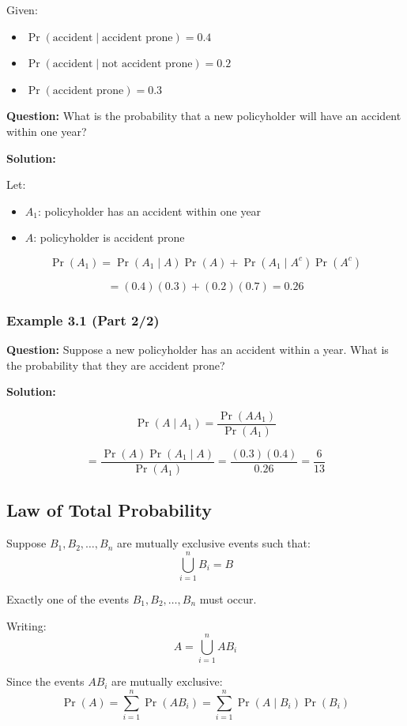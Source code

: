\documentclass[11pt]{article}
\begin{document}
Given:
\begin{itemize}[leftmargin=1.5em]
    \item $\Pr(\text{accident} \mid \text{accident prone}) = 0.4$
    \item $\Pr(\text{accident} \mid \text{not accident prone}) = 0.2$
    \item $\Pr(\text{accident prone}) = 0.3$
\end{itemize}

\textbf{Question:}  
What is the probability that a new policyholder will have an accident within one year?

\textbf{Solution:}

Let:
\begin{itemize}[leftmargin=1.5em]
    \item $A_1$: policyholder has an accident within one year
    \item $A$: policyholder is accident prone
\end{itemize}

\[
\Pr(A_1) = \Pr(A_1 \mid A)\Pr(A) + \Pr(A_1 \mid A^c)\Pr(A^c)
\]

\[
= (0.4)(0.3) + (0.2)(0.7) = 0.26
\]

\subsubsection*{Example 3.1 (Part 2/2)}

\textbf{Question:}  
Suppose a new policyholder has an accident within a year. What is the probability that they are accident prone?

\textbf{Solution:}

\[
\Pr(A \mid A_1) = \frac{\Pr(AA_1)}{\Pr(A_1)}
\]

\[
= \frac{\Pr(A)\Pr(A_1 \mid A)}{\Pr(A_1)}
= \frac{(0.3)(0.4)}{0.26} = \frac{6}{13}
\]

\subsection{Law of Total Probability}

Suppose $B_1, B_2, \ldots, B_n$ are mutually exclusive events such that:
\[
\bigcup_{i=1}^{n} B_i = B
\]

Exactly one of the events $B_1, B_2, \ldots, B_n$ must occur.

Writing:
\[
A = \bigcup_{i=1}^{n} AB_i
\]

Since the events $AB_i$ are mutually exclusive:
\[
\Pr(A) = \sum_{i=1}^{n} \Pr(AB_i)
= \sum_{i=1}^{n} \Pr(A \mid B_i)\Pr(B_i)
\]
\end{document}
